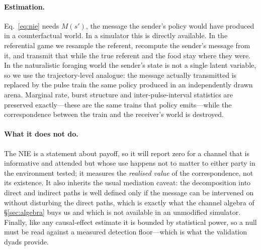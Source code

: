 \paragraph{Estimation.} Eq.~\ref{eq:nie} needs $M(s')$, the message the sender's
policy would have produced in a counterfactual world. In a simulator this is
directly available. In the referential game we resample the referent, recompute
the sender's message from it, and transmit that while the true referent and the
food stay where they were. In the naturalistic foraging world the sender's state
is not a single latent variable, so we use the trajectory-level analogue: the
message actually transmitted is replaced by the pulse train the same policy
produced in an independently drawn arena. Marginal rate, burst structure and
inter-pulse-interval statistics are preserved exactly---these are the same trains
that policy emits---while the correspondence between the train and the receiver's
world is destroyed.

\paragraph{What it does not do.} The NIE is a statement about payoff, so it will
report zero for a channel that is informative and attended but whose use happens
not to matter to either party in the environment tested; it measures the
\emph{realised value} of the correspondence, not its existence. It also inherits
the usual mediation caveat: the decomposition into direct and indirect paths is
well defined only if the message can be intervened on without disturbing the
direct paths, which is exactly what the channel algebra of \S\ref{sec:algebra}
buys us and which is not available in an unmodified simulator. Finally, like any
causal-effect estimate it is bounded by statistical power, so a null must be read
against a measured detection floor---which is what the validation dyads provide.
